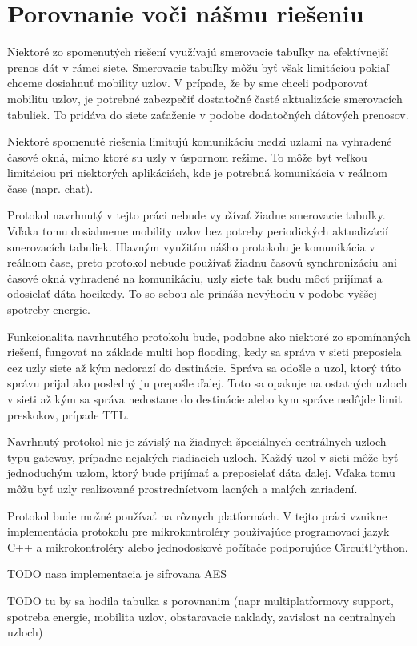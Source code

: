 \documentclass[slovak,master]{diploma}
\begin{document}
\section{Porovnanie voči nášmu riešeniu}
Niektoré zo spomenutých riešení využívajú smerovacie tabuľky na efektívnejší prenos dát v rámci siete. Smerovacie tabuľky môžu byť však limitáciou pokiaľ 
chceme dosiahnuť mobility uzlov. V prípade, že by sme chceli podporovať mobilitu uzlov, je potrebné zabezpečiť dostatočné časté aktualizácie smerovacích tabuliek.
To pridáva do siete zaťaženie v podobe dodatočných dátových prenosov.

Niektoré spomenuté riešenia limitujú komunikáciu medzi uzlami na vyhradené časové okná, mimo ktoré su uzly v úspornom režime. To môže byť 
veľkou limitáciou pri niektorých aplikáciách, kde je potrebná komunikácia v reálnom čase  (napr. chat).

Protokol navrhnutý v tejto práci nebude využívať žiadne smerovacie tabuľky. Vďaka tomu dosiahneme mobility uzlov bez potreby 
periodických aktualizácií smerovacích tabuliek. Hlavným využitím nášho protokolu je komunikácia v reálnom čase, preto protokol nebude používať 
žiadnu časovú synchronizáciu ani časové okná vyhradené na komunikáciu, uzly siete tak budu môcť prijímať a odosielať dáta hocikedy.
To so sebou ale prináša nevýhodu v podobe vyššej spotreby energie.

Funkcionalita navrhnutého protokolu bude, podobne ako niektoré zo spomínaných riešení, fungovať na základe multi hop flooding, kedy sa správa v sieti preposiela cez uzly siete až kým nedorazí do destinácie.
Správa sa odošle a uzol, ktorý túto správu prijal ako posledný ju prepošle ďalej. Toto sa opakuje na ostatných uzloch v sieti až kým sa správa nedostane do destinácie alebo kym správe nedôjde limit preskokov, prípade TTL.

Navrhnutý protokol nie je závislý na žiadnych špeciálnych centrálnych uzloch typu gateway, prípadne nejakých riadiacich uzloch. Každý uzol v sieti môže byť jednoduchým uzlom, ktorý bude prijímať a preposielať dáta ďalej.
Vďaka tomu môžu byť uzly realizované prostredníctvom lacných a malých zariadení.

Protokol bude možné používať na rôznych platformách. V tejto práci vznikne implementácia protokolu pre mikrokontroléry používajúce programovací jazyk C++ a 
mikrokontroléry alebo jednodoskové počítače podporujúce CircuitPython.

TODO nasa implementacia  je sifrovana AES

TODO tu by sa hodila tabulka s porovnanim (napr multiplatformovy support, spotreba energie, mobilita uzlov, obstaravacie naklady, zavislost na centralnych uzloch)
\end{document}
